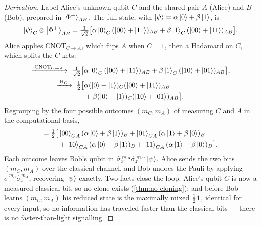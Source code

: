 \begin{proof}[Derivation]
Label Alice's unknown qubit $C$ and the shared pair $A$ (Alice) and $B$
(Bob), prepared in $\ket{\Phi^+}_{AB}$. The full state, with
$\ket{\psi}=\alpha\ket{0}+\beta\ket{1}$, is
\begin{equation}
\ket{\psi}_C\otimes\ket{\Phi^+}_{AB}
=\tfrac{1}{\sqrt2}\bigl[
\alpha\ket{0}_C(\ket{00}+\ket{11})_{AB}
+\beta\ket{1}_C(\ket{00}+\ket{11})_{AB}\bigr].
\end{equation}
Alice applies $\mathrm{CNOT}_{C\to A}$, which flips $A$ when $C=1$, then
a Hadamard on $C$, which splits the $C$ kets:
\begin{align}
\xrightarrow{\;\mathrm{CNOT}_{C\to A}\;}\ \tfrac{1}{\sqrt2}\bigl[
&\alpha\ket{0}_C(\ket{00}+\ket{11})_{AB}
+\beta\ket{1}_C(\ket{10}+\ket{01})_{AB}\bigr],\\
\xrightarrow{\;\mathrm{H}_C\;}\ \tfrac12\bigl[
&\alpha(\ket{0}+\ket{1})_C(\ket{00}+\ket{11})_{AB}\notag\\
&{}+\beta(\ket{0}-\ket{1})_C(\ket{10}+\ket{01})_{AB}\bigr].
\end{align}
Regrouping by the four possible outcomes $(m_C,m_A)$ of measuring $C$
and $A$ in the computational basis,
\begin{equation}
\begin{aligned}
={}\tfrac12\bigl[
&\ket{00}_{CA}(\alpha\ket{0}+\beta\ket{1})_B
+\ket{01}_{CA}(\alpha\ket{1}+\beta\ket{0})_B\\
&{}+\ket{10}_{CA}(\alpha\ket{0}-\beta\ket{1})_B
+\ket{11}_{CA}(\alpha\ket{1}-\beta\ket{0})_B\bigr].
\end{aligned}
\end{equation}
Each outcome leaves Bob's qubit in
$\hat\sigma_x^{\,m_A}\hat\sigma_z^{\,m_C}\ket{\psi}$. Alice sends the two
bits $(m_C,m_A)$ over the classical channel, and Bob undoes the Pauli by
applying $\hat\sigma_z^{\,m_C}\hat\sigma_x^{\,m_A}$, recovering
$\ket{\psi}$ exactly. Two facts close the loop: Alice's qubit $C$ is now
a measured classical bit, so no clone exists (\cref{thm:no-cloning});
and before Bob learns $(m_C,m_A)$ his reduced state is the maximally
mixed $\tfrac12\mathbf{1}$, identical for every input, so no information has
travelled faster than the classical bits --- there is no
faster-than-light signalling.
\end{proof}

